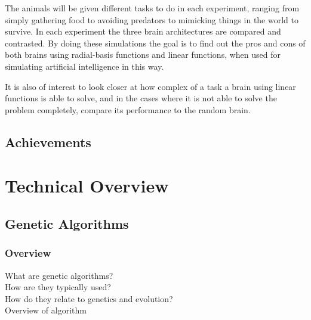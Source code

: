 \documentclass[a4paper,11pt]{kth-mag}
\begin{document}
The animals will be given different tasks to do in each experiment, ranging from simply gathering food to avoiding predators to mimicking things in the world to survive. In each experiment the three brain architectures are compared and contrasted. By doing these simulations the goal is to find out the pros and cons of both brains using radial-basis functions and linear functions, when used for simulating artificial intelligence in this way.

It is also of interest to look closer at how complex of a task a brain using linear functions is able to solve, and in the cases where it is not able to solve the problem completely, compare its performance to the random brain.


\section{Achievements}

\chapter{Technical Overview}

\section{Genetic Algorithms}

\subsection{Overview}
What are genetic algorithms?\\
How are they typically used?\\
How do they relate to genetics and evolution?\\
Overview of algorithm\\
\end{document}
